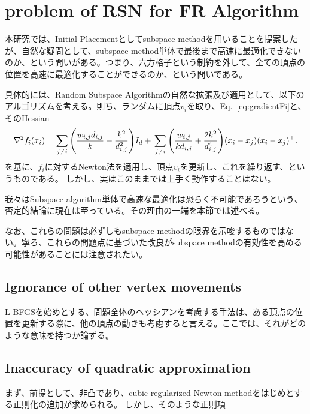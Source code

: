 \documentclass[dvipdfmx,journal]{IEEEtran}
\begin{document}
\section{problem of RSN for FR Algorithm}\label{sec:problemRSN}

本研究では、Initial Placementとしてsubspace methodを用いることを提案したが、自然な疑問として、subspace method単体で最後まで高速に最適化できないのか、という問いがある。つまり、六方格子という制約を外して、全ての頂点の位置を高速に最適化することができるのか、という問いである。

具体的には、Random Subspace Algorithmの自然な拡張及び適用として、以下のアルゴリズムを考える。則ち、ランダムに頂点$v_i$を取り、Eq.~\ref{eq:gradientFi}と、そのHessian
\begin{equation*}
  \nabla^2 f_i(x_i) = \sum_{j \neq i} \qty(\frac{w_{i,j}d_{i,j}}{k} - \frac{k^2}{d_{i,j}^2}) I_d +      \\
  \sum_{j \neq i} \qty(\frac{w_{i,j}}{k d_{i,j}} + \frac{2k^2}{d_{i,j}^4}) (x_i - x_j)(x_i - x_j)^\top.
\end{equation*}
を基に、$f_i$に対するNewton法を適用し、頂点$v_i$を更新し、これを繰り返す、というものである。
しかし、実はこのままでは上手く動作することはない。

我々はSubspace algorithm単体で高速な最適化は恐らく不可能であろうという、否定的結論に現在は至っている。その理由の一端を本節では述べる。

なお、これらの問題は必ずしもsubspace methodの限界を示唆するものではない。寧ろ、これらの問題点に基づいた改良がsubspace methodの有効性を高める可能性があることには注意されたい。

\subsection{Ignorance of other vertex movements}\label{ssec:ignorance}

L-BFGSを始めとする、問題全体のヘッシアンを考慮する手法は、ある頂点の位置を更新する際に、他の頂点の動きも考慮すると言える。ここでは、それがどのような意味を持つか論ずる。

\subsection{Inaccuracy of quadratic approximation}\label{ssec:inaccuracy}

まず、前提として、非凸であり、cubic regularized Newton methodをはじめとする正則化の追加が求められる。
しかし、そのような正則項
\end{document}

